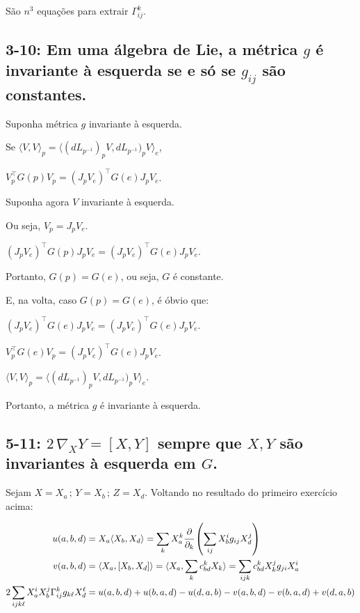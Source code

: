 \documentclass[12pt]{article}
\begin{document}
		S\~ao $n^3$ equa\c{c}\~oes para extrair $\Gamma_{ij}^k$.

		\subsection{3-10: Em uma \'algebra de Lie, a m\'etrica $g$ \'e invariante \`a esquerda se e s\'o se $g_{ij}$ s\~ao constantes.}
		\begin{flushright}
		\end{flushright}

		Suponha m\'etrica $g$ invariante \`a esquerda.

		Se $\langle V, V \rangle_p = \langle (dL_{p^{-1}})_p V, dL_{p^{-1}})_p V\rangle_e$,

		$V_p^\top G(p) V_p = (J_p V_e)^\top G(e) J_p V_e$.

		Suponha agora $V$ invariante \`a esquerda.

		Ou seja, $V_p = J_p V_e$.

		$(J_p V_e)^\top G(p) J_p V_e = (J_p V_e)^\top G(e) J_p V_e$.

		Portanto, $G(p) = G(e)$, ou seja, $G$ \'e constante.

		\vspace{3mm}

		E, na volta, caso $G(p) = G(e)$, \'e \'obvio que:

		$(J_p V_e)^\top G(e) J_p V_e = (J_p V_e)^\top G(e) J_p V_e$.

		$V_p^\top G(e) V_p = (J_p V_e)^\top G(e) J_p V_e$.

		$\langle V, V \rangle_p = \langle (dL_{p^{-1}})_p V, dL_{p^{-1}})_p V\rangle_e$.

		Portanto, a m\'etrica $g$ \'e invariante \`a esquerda.

		\subsection{5-11: $2\, \nabla_X Y = [X, Y]$ sempre que $X, Y$ s\~ao invariantes \`a esquerda em $G$.}
		\begin{flushright}
		\end{flushright}

		Sejam $X = X_a\,;\,Y = X_b\,;\,Z = X_d$. Voltando no resultado do primeiro exerc\'icio acima:

		\begin{align}
		u(a, b, d) &= X_a\langle X_b,X_d\rangle = \sum_k X_a^k \cfrac{\partial}{\partial_k} \left( \sum_{ij} X_b^i g_{ij} X_d^j \right) \\
		v(a,b,d) &= \langle X_a, [X_b,X_d]\rangle = \langle X_a, \sum_k c_{bd}^k X_k\rangle = \sum_{ijk} c_{bd}^k X_k^j g_{ji} X_a^i \\
		2 \sum_{ijk\ell} X_a^i X_b^j \Gamma_{ij}^k g_{k\ell} X_d^\ell &= u(a,b,d) + u(b,a,d) - u(d,a,b) - v(a,b,d) - v(b,a,d) + v(d,a,b)
		\end{align}
\end{document}
